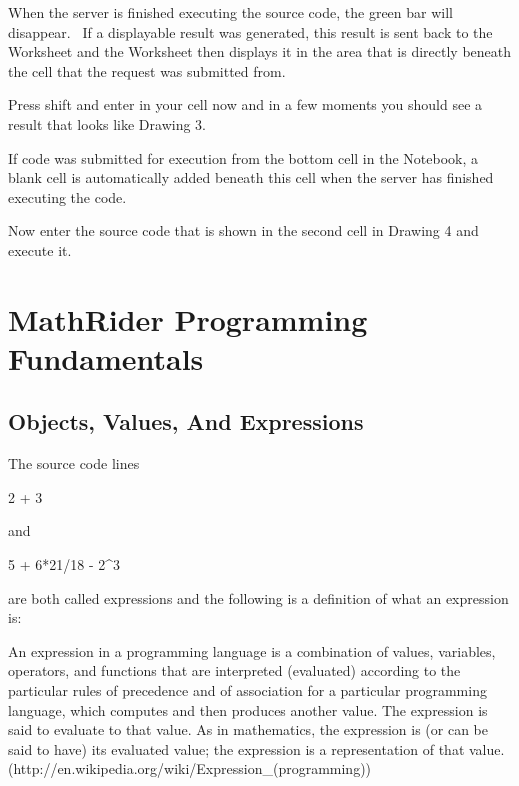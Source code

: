 \documentclass[12pt,twoside]{book}
\begin{document}
\bigskip


\bigskip

When the server is finished executing the source code, the green bar will disappear. \ If a displayable result was generated, this result is sent back to the Worksheet and the Worksheet then displays it in the area that is directly beneath the cell that the request was submitted from. 

\bigskip

Press shift and enter in your cell now and in a few moments you should see a result that looks like Drawing 3. 

\bigskip

If code was submitted for execution from the bottom cell in the Notebook, a blank cell is automatically added beneath this cell when the server has finished executing the code. 

\bigskip

Now enter the source code that is shown in the second cell in Drawing 4 and execute it.  


\bigskip

\chapter[MathRider Programming Fundamentals]{MathRider Programming Fundamentals}

\section[Objects, Values, And Expressions]{Objects, Values, And Expressions}

The source code lines


\bigskip

2 + 3 


\bigskip

and 


\bigskip

5 + 6*21/18 {}- 2\^{}3


\bigskip

are both called expressions and the following is a definition of what an expression is: 

\bigskip

An expression in a programming language is a combination of values, variables, operators, and functions that are interpreted (evaluated) according to the particular rules of precedence and of association for a particular programming language, which computes and then produces another value. The expression is said to evaluate to that value. As in mathematics, the expression is (or can be said to have) its evaluated value; the expression is a representation of that value. (http://en.wikipedia.org/wiki/Expression\_(programming)) 
\end{document}
